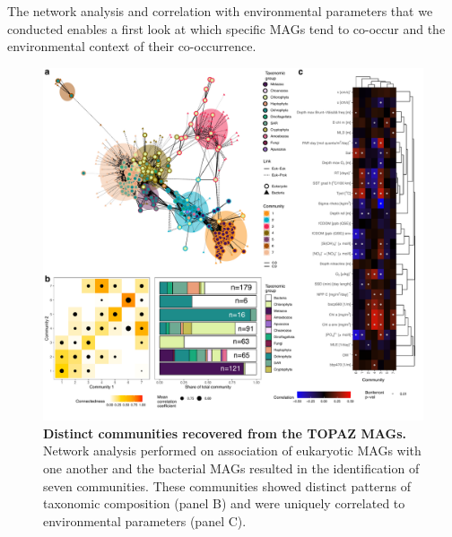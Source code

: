 \documentclass[12pt]{article}
\numberwithin{equation}{section}
\begin{document}
The network analysis and correlation with environmental parameters that we conducted enables a first look at which specific MAGs tend to co-occur and the environmental context of their co-occurrence.




\begin{figure}[h!]    %
    \centering
    \includegraphics[width = \columnwidth]{figures/Figure6_Networks.pdf}
    \caption{ \textbf{Distinct communities recovered from the TOPAZ MAGs.} Network analysis performed on association of eukaryotic MAGs with one another and the bacterial MAGs resulted in the identification of seven communities. These communities showed distinct patterns of taxonomic composition (panel B) and were uniquely correlated to environmental parameters (panel C).}
    \label{fig:fig6-network}
\end{figure}
\end{document}
